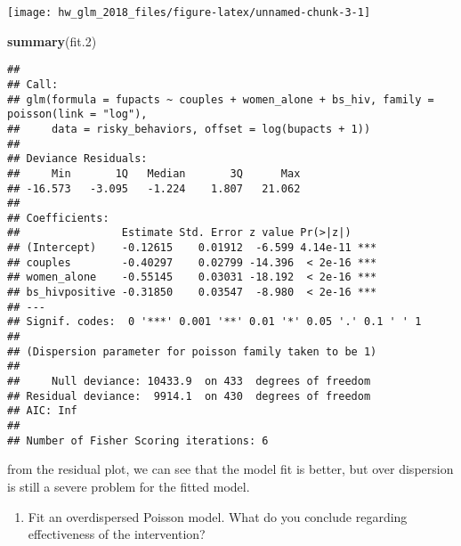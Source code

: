 \documentclass[]{article}
\newenvironment{Shaded}{\begin{snugshade}}{\end{snugshade}}
\newcommand{\FloatTok}[1]{\textcolor[rgb]{0.00,0.00,0.81}{#1}}
\newcommand{\KeywordTok}[1]{\textcolor[rgb]{0.13,0.29,0.53}{\textbf{#1}}}
\newcommand{\NormalTok}[1]{#1}
\providecommand{\tightlist}{%
  \setlength{\itemsep}{0pt}\setlength{\parskip}{0pt}}
\begin{document}
\begin{center}\texttt{[image: hw\_glm\_2018\_files/figure-latex/unnamed-chunk-3-1]} \end{center}

\begin{Shaded}
\begin{Highlighting}[]
\KeywordTok{summary}\NormalTok{(fit}\FloatTok{.2}\NormalTok{)}
\end{Highlighting}
\end{Shaded}

\begin{verbatim}
## 
## Call:
## glm(formula = fupacts ~ couples + women_alone + bs_hiv, family = poisson(link = "log"), 
##     data = risky_behaviors, offset = log(bupacts + 1))
## 
## Deviance Residuals: 
##     Min       1Q   Median       3Q      Max  
## -16.573   -3.095   -1.224    1.807   21.062  
## 
## Coefficients:
##                Estimate Std. Error z value Pr(>|z|)    
## (Intercept)    -0.12615    0.01912  -6.599 4.14e-11 ***
## couples        -0.40297    0.02799 -14.396  < 2e-16 ***
## women_alone    -0.55145    0.03031 -18.192  < 2e-16 ***
## bs_hivpositive -0.31850    0.03547  -8.980  < 2e-16 ***
## ---
## Signif. codes:  0 '***' 0.001 '**' 0.01 '*' 0.05 '.' 0.1 ' ' 1
## 
## (Dispersion parameter for poisson family taken to be 1)
## 
##     Null deviance: 10433.9  on 433  degrees of freedom
## Residual deviance:  9914.1  on 430  degrees of freedom
## AIC: Inf
## 
## Number of Fisher Scoring iterations: 6
\end{verbatim}

from the residual plot, we can see that the model fit is better, but
over dispersion is still a severe problem for the fitted model.

\begin{enumerate}
\def\labelenumi{\arabic{enumi}.}
\setcounter{enumi}{2}
\tightlist
\item
  Fit an overdispersed Poisson model. What do you conclude regarding
  effectiveness of the intervention?
\end{enumerate}
\end{document}
